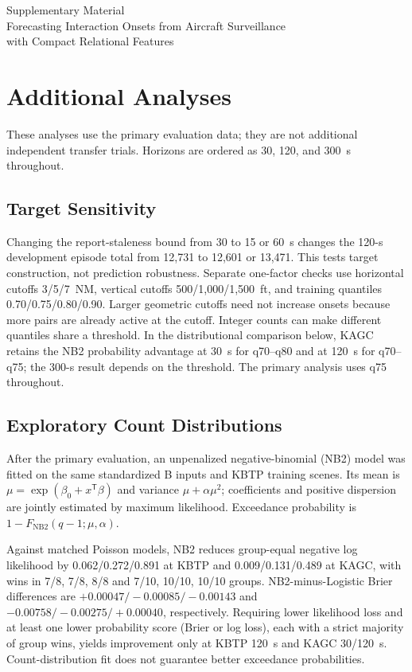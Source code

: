 \documentclass[10pt,journal,letterpaper]{IEEEtran}
\begin{document}
\begin{center}
{\large Supplementary Material}\\[3pt]
Forecasting Interaction Onsets from Aircraft Surveillance\\
with Compact Relational Features
\end{center}
\setcounter{table}{1}
\setcounter{equation}{2}
\section{Additional Analyses}
These analyses use the primary evaluation data; they are not additional independent transfer trials. Horizons are ordered as 30, 120, and 300~s throughout.

\subsection{Target Sensitivity}
Changing the report-staleness bound from 30 to 15 or 60~s changes the 120-s development episode total from 12,731 to 12,601 or 13,471. This tests target construction, not prediction robustness. Separate one-factor checks use horizontal cutoffs 3/5/7~NM, vertical cutoffs 500/1,000/1,500~ft, and training quantiles 0.70/0.75/0.80/0.90. Larger geometric cutoffs need not increase onsets because more pairs are already active at the cutoff. Integer counts can make different quantiles share a threshold. In the distributional comparison below, KAGC retains the NB2 probability advantage at 30~s for q70--q80 and at 120~s for q70--q75; the 300-s result depends on the threshold. The primary analysis uses q75 throughout.

\subsection{Exploratory Count Distributions}
After the primary evaluation, an unpenalized negative-binomial (NB2) model was fitted on the same standardized B inputs and KBTP training scenes. Its mean is $\mu=\exp(\beta_0+x^{\mathsf T}\beta)$ and variance $\mu+\alpha\mu^2$; coefficients and positive dispersion are jointly estimated by maximum likelihood. Exceedance probability is $1-F_{\mathrm{NB2}}(q-1;\mu,\alpha)$.

Against matched Poisson models, NB2 reduces group-equal negative log likelihood by 0.062/0.272/0.891 at KBTP and 0.009/0.131/0.489 at KAGC, with wins in 7/8, 7/8, 8/8 and 7/10, 10/10, 10/10 groups. NB2-minus-Logistic Brier differences are $+0.00047/-0.00085/-0.00143$ and $-0.00758/-0.00275/+0.00040$, respectively. Requiring lower likelihood loss and at least one lower probability score (Brier or log loss), each with a strict majority of group wins, yields improvement only at KBTP 120~s and KAGC 30/120~s. Count-distribution fit does not guarantee better exceedance probabilities.
\end{document}
